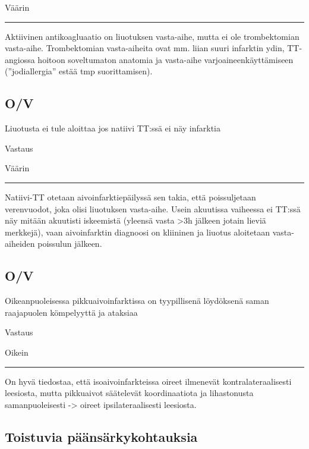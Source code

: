 \documentclass[
]{book}
\begin{document}
Väärin

\begin{center}\rule{0.5\linewidth}{0.5pt}\end{center}

Aktiivinen antikoagluaatio on liuotuksen vasta-aihe, mutta ei ole trombektomian vasta-aihe. Trombektomian vasta-aiheita ovat mm. liian suuri infarktin ydin, TT-angiossa hoitoon soveltumaton anatomia ja vasta-aihe varjoaineenkäyttämiseen (''jodiallergia'' estää tmp suorittamisen).

\subsection{O/V}\label{ov-44}

Liuotusta ei tule aloittaa jos natiivi TT:ssä ei näy infarktia

Vastaus

Väärin

\begin{center}\rule{0.5\linewidth}{0.5pt}\end{center}

Natiivi-TT otetaan aivoinfarktiepäilyssä sen takia, että poissuljetaan verenvuodot, joka olisi liuotuksen vasta-aihe. Usein akuutissa vaiheessa ei TT:ssä näy mitään akuutisti iskeemistä (yleensä vasta \textgreater3h jälkeen jotain lieviä merkkejä), vaan aivoinfarktin diagnoosi on kliininen ja liuotus aloitetaan vasta-aiheiden poissulun jälkeen.

\subsection{O/V}\label{ov-45}

Oikeanpuoleisessa pikkuaivoinfarktissa on tyypillisenä löydöksenä saman raajapuolen kömpelyyttä ja ataksiaa

Vastaus

Oikein

\begin{center}\rule{0.5\linewidth}{0.5pt}\end{center}

On hyvä tiedostaa, että isoaivoinfarkteissa oireet ilmenevät kontralateraalisesti leesiosta, mutta pikkuaivot säätelevät koordinaatiota ja lihastonusta samanpuoleisesti -\textgreater{} oireet ipsilateraalisesti leesiosta.\\

\subsection{Toistuvia päänsärkykohtauksia}\label{toistuvia-puxe4uxe4nsuxe4rkykohtauksia}
\end{document}
